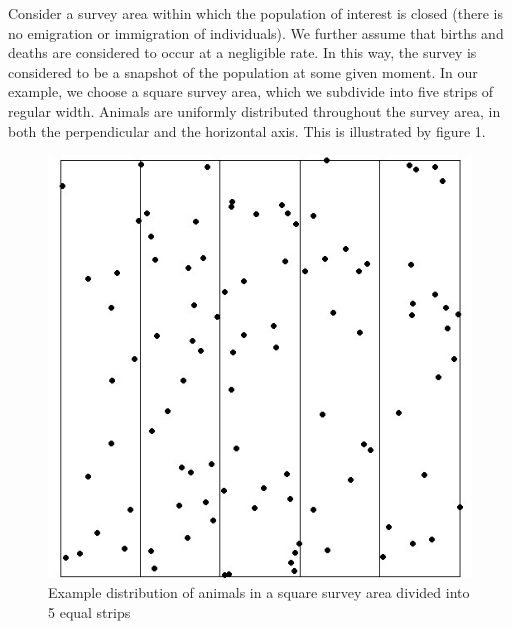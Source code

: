 \documentclass[11pt]{article}
\begin{document}
\begin{multicols}{2}
Consider a survey area within which the population of interest is closed (there is no emigration or immigration of individuals). We further assume that births and deaths are considered to occur at a negligible rate. In this way, the survey is considered to be a snapshot of the population at some given moment. In our example, we choose a square survey area, which we subdivide into five strips of regular width. Animals are uniformly distributed throughout the survey area, in both the perpendicular and the horizontal axis. This is illustrated by figure 1. 

\begin{figure}[H]
\centering
\includegraphics[scale=0.5]{StripSampling}
\caption{Example distribution of animals in a square survey area divided into 5 equal strips}
\end{figure}


\end{multicols}
\end{document}
